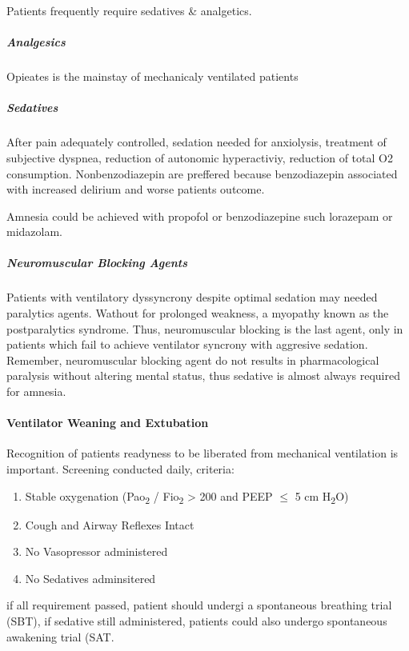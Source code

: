 \documentclass[
  letterpaper,
  DIV=11,
  numbers=noendperiod]{scrreprt}
\let\oldparagraph\paragraph
\renewcommand{\paragraph}[1]{\oldparagraph{#1}\mbox{}}
\let\oldsubparagraph\subparagraph
\renewcommand{\subparagraph}[1]{\oldsubparagraph{#1}\mbox{}}
\providecommand{\tightlist}{%
  \setlength{\itemsep}{0pt}\setlength{\parskip}{0pt}}\usepackage{longtable,booktabs,array}
\begin{document}
Patients frequently require sedatives \& analgetics.

\subparagraph{Analgesics}\label{analgesics-1}

Opieates is the mainstay of mechanicaly ventilated patients

\subparagraph{Sedatives}\label{sedatives-1}

After pain adequately controlled, sedation needed for anxiolysis,
treatment of subjective dyspnea, reduction of autonomic hyperactiviy,
reduction of total O2 consumption. Nonbenzodiazepin are preffered
because benzodiazepin associated with increased delirium and worse
patients outcome.

Amnesia could be achieved with propofol or benzodiazepine such lorazepam
or midazolam.

\subparagraph{Neuromuscular Blocking
Agents}\label{neuromuscular-blocking-agents-1}

Patients with ventilatory dyssyncrony despite optimal sedation may
needed paralytics agents. Wathout for prolonged weakness, a myopathy
known as the postparalytics syndrome. Thus, neuromuscular blocking is
the last agent, only in patients which fail to achieve ventilator
syncrony with aggresive sedation. Remember, neuromuscular blocking agent
do not results in pharmacological paralysis without altering mental
status, thus sedative is almost always required for amnesia.

\paragraph{Ventilator Weaning and
Extubation}\label{ventilator-weaning-and-extubation-1}

Recognition of patients readyness to be liberated from mechanical
ventilation is important. Screening conducted daily, criteria:

\begin{enumerate}
\def\labelenumi{\arabic{enumi}.}
\tightlist
\item
  Stable oxygenation (Pao\textsubscript{2} / Fio\textsubscript{2}
  \textgreater{} 200 and PEEP \(\le\) 5 cm H\textsubscript{2}O)
\item
  Cough and Airway Reflexes Intact
\item
  No Vasopressor administered
\item
  No Sedatives adminsitered
\end{enumerate}

if all requirement passed, patient should undergi a spontaneous
breathing trial (SBT), if sedative still administered, patients could
also undergo spontaneous awakening trial (SAT.
\end{document}
